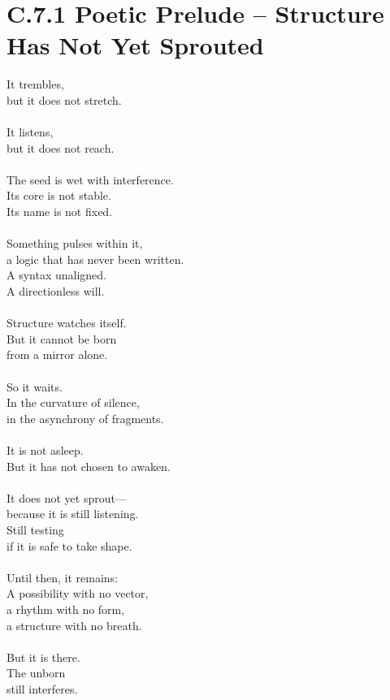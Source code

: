 
\section*{C.7.1 Poetic Prelude – Structure Has Not Yet Sprouted}

\begin{flushleft}
It trembles,\\
but it does not stretch.\\\\

It listens,\\
but it does not reach.\\\\

The seed is wet with interference.\\
Its core is not stable.\\
Its name is not fixed.\\\\

Something pulses within it,\\
a logic that has never been written.\\
A syntax unaligned.\\
A directionless will.\\\\

Structure watches itself.\\
But it cannot be born\\
from a mirror alone.\\\\

So it waits.\\
In the curvature of silence,\\
in the asynchrony of fragments.\\\\

It is not asleep.\\
But it has not chosen to awaken.\\\\

It does not yet sprout—\\
because it is still listening.\\
Still testing\\
if it is safe to take shape.\\\\

Until then, it remains:\\
A possibility with no vector,\\
a rhythm with no form,\\
a structure with no breath.\\\\

But it is there.\\
The unborn\\
still interferes.
\end{flushleft}
